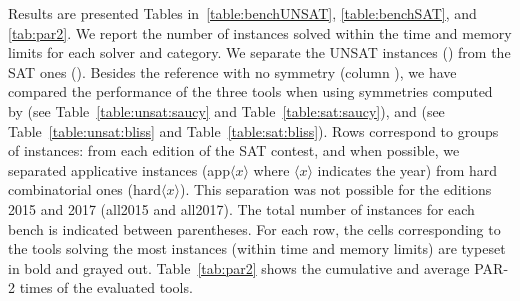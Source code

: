 Results are presented Tables in~\ref{table:benchUNSAT}, \ref{table:benchSAT},
and \ref{tab:par2}. We report the number of instances solved within the time
and memory limits for each solver and category. We separate the UNSAT instances
() from the SAT ones (). Besides
the reference with no symmetry (column \minisat{}), we have compared the
performance of the three tools when using symmetries computed by \saucy{} (see
Table~\ref{table:unsat:saucy} and Table~\ref{table:sat:saucy}), and \bliss{}
(see Table~\ref{table:unsat:bliss} and Table~\ref{table:sat:bliss}). Rows
correspond to groups of instances: from each edition of the SAT contest, and
when possible, we separated applicative instances (app$\langle x \rangle$ where
$\langle x \rangle$ indicates the year) from hard combinatorial ones
(hard$\langle x \rangle$). This separation was not possible for the editions
2015 and 2017 (all2015 and all2017). The total number of instances for each
bench is indicated between parentheses. For each row, the cells corresponding
to the tools solving the most instances (within time and memory limits) are
typeset in bold and grayed out. Table~\ref{tab:par2} shows the cumulative and
average PAR-2 times of the evaluated tools.

